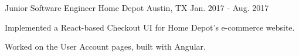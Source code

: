 

\begin{cventries}

    \cventry
    {Junior Software Engineer} %
    {Home Depot} %
    {Austin, TX} %
    {Jan. 2017 - Aug. 2017} %
    {
        \vspace{-4mm}
        \begin{cvitems} %
            \item {Implemented a React-based Checkout UI for Home Depot's e-commerce website.}
            \item {Worked on the User Account pages, built with Angular.}
        \end{cvitems}
    }


\end{cventries}
